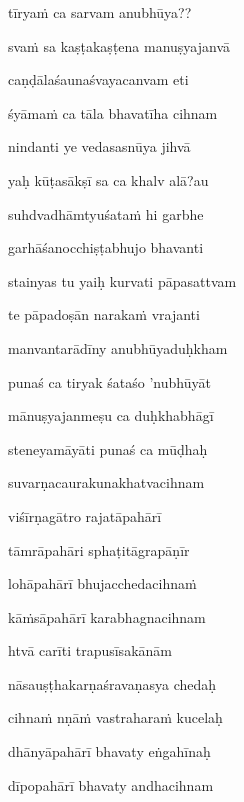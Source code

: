 \ujvers\nemsloka 
tīryaṁ ca sarvam anubhūya??
\dontdisplaylinenum

\nemslokab 
svaṁ sa kaṣṭakaṣṭena manuṣyajanvā \danda\dontdisplaylinenum

\nemslokac 
caṇḍālaśaunaśvayacanvam eti
\dontdisplaylinenum

\nemslokad 
śyāmaṁ ca tāla bhavatīha cihnam \veg\dontdisplaylinenum

\ujvers\nemsloka 
nindanti ye vedasasnūya jihvā
\dontdisplaylinenum

\nemslokab 
yaḥ kūṭasākṣī sa ca khalv alā?au \danda\dontdisplaylinenum

\nemslokac 
suhdvadhāmtyuśataṁ hi garbhe
\dontdisplaylinenum

\nemslokad 
garhāśanocchiṣṭabhujo bhavanti \veg\dontdisplaylinenum

\ujvers\nemsloka 
stainyas tu yaiḥ kurvati pāpasattvam
\dontdisplaylinenum

\nemslokab 
te pāpadoṣān narakaṁ vrajanti \danda\dontdisplaylinenum

\nemslokac 
manvantarādīny anubhūyaduḥkham
\dontdisplaylinenum

\nemslokad 
punaś ca tiryak śataśo 'nubhūyāt \veg\dontdisplaylinenum

\ujvers\nemsloka 
mānuṣyajanmeṣu ca duḥkhabhāgī
\dontdisplaylinenum

\nemslokab 
steneyamāyāti punaś ca mūḍhaḥ \danda\dontdisplaylinenum

\nemslokac 
suvarṇacaurakunakhatvacihnam
\dontdisplaylinenum

\nemslokad 
viśīrṇagātro rajatāpahārī \veg\dontdisplaylinenum

\ujvers\nemsloka 
tāmrāpahāri sphaṭitāgrapāṇīr
\dontdisplaylinenum

\nemslokab 
lohāpahārī bhujacchedacihnaṁ \danda\dontdisplaylinenum

\nemslokac 
kāṁsāpahārī karabhagnacihnam
\dontdisplaylinenum

\nemslokad 
htvā carīti trapusīsakānām \veg\dontdisplaylinenum

\ujvers\nemsloka 
nāsauṣṭhakarṇaśravaṇasya chedaḥ
\dontdisplaylinenum

\nemslokab 
cihnaṁ nṇāṁ vastraharaṁ kucelaḥ \danda\dontdisplaylinenum

\nemslokac 
dhānyāpahārī bhavaty eṅgahīnaḥ
\dontdisplaylinenum

\nemslokad 
dīpopahārī bhavaty andhacihnam \veg\dontdisplaylinenum


